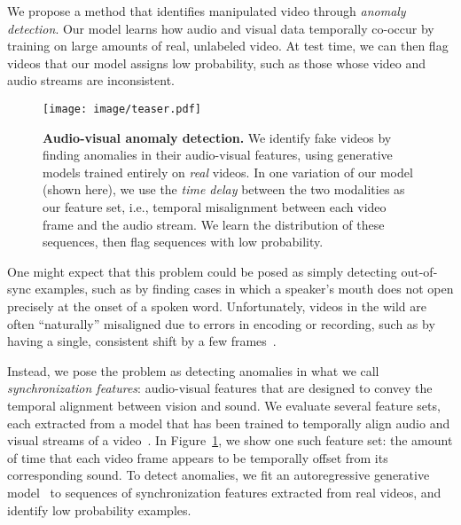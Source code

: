 \documentclass[10pt,twocolumn,letterpaper]{article}
\begin{document}
We propose a method that identifies manipulated video through {\em anomaly detection}. Our model learns how audio and visual data temporally co-occur by training on large amounts of real, unlabeled video. At test time, we can then flag videos that our model assigns low probability, such as those whose video and audio streams are inconsistent.



\begin{figure}[t!]
    \centering
    \vspace{-2mm}
    \texttt{[image: image/teaser.pdf]}
    
      \vspace{-0.5mm}
            \caption{{\bf Audio-visual anomaly detection.}  We identify fake videos by finding anomalies in their audio-visual features, using generative models trained entirely on {\em real} videos. In one variation of our model (shown here), we use the {\em time delay} between the two modalities as our feature set, i.e., temporal misalignment between each video frame and the audio stream. We learn the distribution of these sequences, then flag sequences with low probability.
      } 
      \vspace{-2mm}
    \label{teaser}
\end{figure} 
 
One might expect that this problem could be posed as simply {detecting} {out-of-sync} examples, such as by finding  cases in which a speaker's mouth does not open precisely at the onset of a spoken word.
Unfortunately, videos in the wild are often ``naturally'' misaligned due to errors in encoding or recording, such as by having a single, consistent shift by a few frames~\cite{chung2016out,afouras2021selfsupervised}.

Instead, we pose the problem as detecting anomalies in what we call {\em synchronization features}: audio-visual features that are designed to convey the temporal alignment between vision and sound. We evaluate several feature sets, each extracted from a model that has been trained to temporally align audio and visual streams of a video~\cite{chen2021audio,owens2018audio,chung2016out}. In Figure~\ref{teaser}, we show one such feature set:  the amount of time that each video frame appears to be temporally offset from its corresponding sound. To detect anomalies, we fit an autoregressive generative model~\cite{vaswani2017attention,radford2019language} to sequences of synchronization features extracted from real videos, and identify low probability examples.
\end{document}
